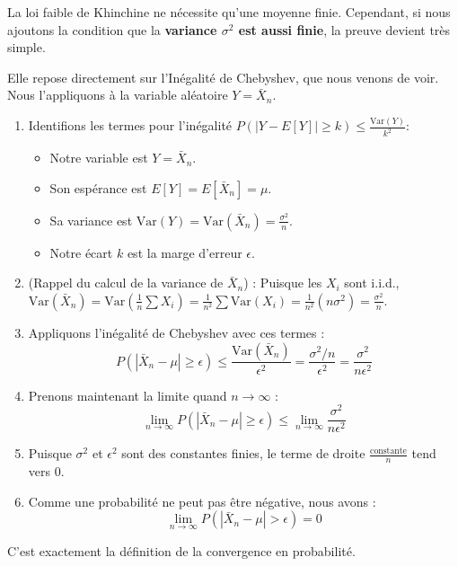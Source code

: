 \begin{proofbox}
La loi faible de Khinchine ne nécessite qu'une moyenne finie. Cependant, si nous ajoutons la condition que la \textbf{variance $\sigma^2$ est aussi finie}, la preuve devient très simple.

Elle repose directement sur l'Inégalité de Chebyshev, que nous venons de voir. Nous l'appliquons à la variable aléatoire $Y = \bar{X}_n$.

\begin{enumerate}
    \item Identifions les termes pour l'inégalité $P(|Y - E[Y]| \ge k) \le \frac{\text{Var}(Y)}{k^2}$:
    \begin{itemize}
        \item Notre variable est $Y = \bar{X}_n$.
        \item Son espérance est $E[Y] = E[\bar{X}_n] = \mu$.
        \item Sa variance est $\text{Var}(Y) = \text{Var}(\bar{X}_n) = \frac{\sigma^2}{n}$.
        \item Notre écart $k$ est la marge d'erreur $\epsilon$.
    \end{itemize}

    \item (Rappel du calcul de la variance de $\bar{X}_n$) :
    Puisque les $X_i$ sont i.i.d., $\text{Var}(\bar{X}_n) = \text{Var}\left(\frac{1}{n}\sum X_i\right) = \frac{1}{n^2}\sum \text{Var}(X_i) = \frac{1}{n^2}(n\sigma^2) = \frac{\sigma^2}{n}$.

    \item Appliquons l'inégalité de Chebyshev avec ces termes :
    $$ P(|\bar{X}_n - \mu| \ge \epsilon) \le \frac{\text{Var}(\bar{X}_n)}{\epsilon^2} = \frac{\sigma^2 / n}{\epsilon^2} = \frac{\sigma^2}{n \epsilon^2} $$
    
    \item Prenons maintenant la limite quand $n \to \infty$ :
    $$ \lim_{n \to \infty} P(|\bar{X}_n - \mu| \ge \epsilon) \le \lim_{n \to \infty} \frac{\sigma^2}{n \epsilon^2} $$
    
    \item Puisque $\sigma^2$ et $\epsilon^2$ sont des constantes finies, le terme de droite $\frac{\text{constante}}{n}$ tend vers 0.
    
    \item Comme une probabilité ne peut pas être négative, nous avons :
    $$ \lim_{n \to \infty} P(|\bar{X}_n - \mu| > \epsilon) = 0 $$
\end{enumerate}
C'est exactement la définition de la convergence en probabilité.
\end{proofbox}

